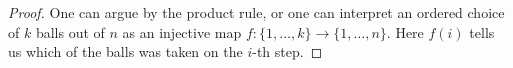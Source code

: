 

\setcounter{section}{2}
\setcounter{subsection}{3}
\setcounter{dfn}{10}

\begin{proof}
One can argue by the product rule, or one can interpret an ordered choice of $k$ balls out of $n$ as an injective map $f \colon \{1, \ldots, k\} \to \{1, \ldots, n\}$.
Here $f(i)$ tells us which of the balls was taken on the $i$-th step.
\end{proof}





